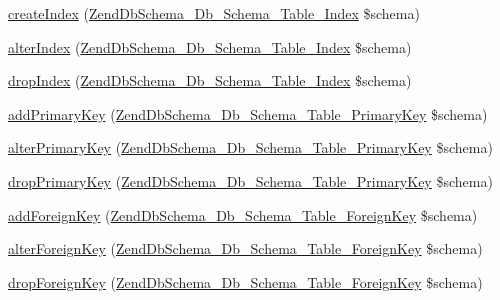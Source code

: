 \begin{DoxyCompactItemize}
\item 
\hyperlink{classZendDbSchema__Db__Schema__Generator__Mysql_a5546e56c0c78f9c9d3e830fb5ffcd72d}{create\-Index} (\hyperlink{classZendDbSchema__Db__Schema__Table__Index}{\-Zend\-Db\-Schema\-\_\-\-Db\-\_\-\-Schema\-\_\-\-Table\-\_\-\-Index} \$schema)
\item 
\hyperlink{classZendDbSchema__Db__Schema__Generator__Mysql_a0f94d6cabe125b387efa64fc7160a9e5}{alter\-Index} (\hyperlink{classZendDbSchema__Db__Schema__Table__Index}{\-Zend\-Db\-Schema\-\_\-\-Db\-\_\-\-Schema\-\_\-\-Table\-\_\-\-Index} \$schema)
\item 
\hyperlink{classZendDbSchema__Db__Schema__Generator__Mysql_a196fb89cf511d31c7124169247de1a6d}{drop\-Index} (\hyperlink{classZendDbSchema__Db__Schema__Table__Index}{\-Zend\-Db\-Schema\-\_\-\-Db\-\_\-\-Schema\-\_\-\-Table\-\_\-\-Index} \$schema)
\item 
\hyperlink{classZendDbSchema__Db__Schema__Generator__Mysql_ad1d5ebbad469fcd572d46f08f9f0e5ab}{add\-Primary\-Key} (\hyperlink{classZendDbSchema__Db__Schema__Table__PrimaryKey}{\-Zend\-Db\-Schema\-\_\-\-Db\-\_\-\-Schema\-\_\-\-Table\-\_\-\-Primary\-Key} \$schema)
\item 
\hyperlink{classZendDbSchema__Db__Schema__Generator__Mysql_a2991a5e882a0b6015c0972668215d612}{alter\-Primary\-Key} (\hyperlink{classZendDbSchema__Db__Schema__Table__PrimaryKey}{\-Zend\-Db\-Schema\-\_\-\-Db\-\_\-\-Schema\-\_\-\-Table\-\_\-\-Primary\-Key} \$schema)
\item 
\hyperlink{classZendDbSchema__Db__Schema__Generator__Mysql_acc787f589296a3638f713b91456acafb}{drop\-Primary\-Key} (\hyperlink{classZendDbSchema__Db__Schema__Table__PrimaryKey}{\-Zend\-Db\-Schema\-\_\-\-Db\-\_\-\-Schema\-\_\-\-Table\-\_\-\-Primary\-Key} \$schema)
\item 
\hyperlink{classZendDbSchema__Db__Schema__Generator__Mysql_a4b0c6d7fbd4d21f027facb6e495d1f6b}{add\-Foreign\-Key} (\hyperlink{classZendDbSchema__Db__Schema__Table__ForeignKey}{\-Zend\-Db\-Schema\-\_\-\-Db\-\_\-\-Schema\-\_\-\-Table\-\_\-\-Foreign\-Key} \$schema)
\item 
\hyperlink{classZendDbSchema__Db__Schema__Generator__Mysql_a16b347a1c95888775b09d14505bae2b2}{alter\-Foreign\-Key} (\hyperlink{classZendDbSchema__Db__Schema__Table__ForeignKey}{\-Zend\-Db\-Schema\-\_\-\-Db\-\_\-\-Schema\-\_\-\-Table\-\_\-\-Foreign\-Key} \$schema)
\item 
\hyperlink{classZendDbSchema__Db__Schema__Generator__Mysql_afa7990c889464576d30d4a110e9b0fac}{drop\-Foreign\-Key} (\hyperlink{classZendDbSchema__Db__Schema__Table__ForeignKey}{\-Zend\-Db\-Schema\-\_\-\-Db\-\_\-\-Schema\-\_\-\-Table\-\_\-\-Foreign\-Key} \$schema)

\end{DoxyCompactItemize}
